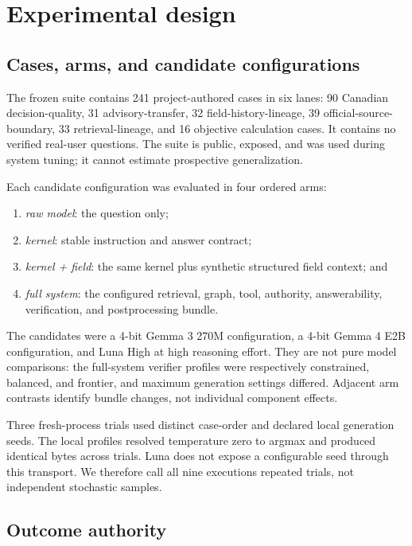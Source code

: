 \documentclass[9pt,twocolumn]{article}
\begin{document}
\section{Experimental design}

\subsection{Cases, arms, and candidate configurations}

The frozen suite contains 241 project-authored cases in six lanes: 90 Canadian decision-quality, 31 advisory-transfer, 32 field-history-lineage, 39 official-source-boundary, 33 retrieval-lineage, and 16 objective calculation cases. It contains no verified real-user questions. The suite is public, exposed, and was used during system tuning; it cannot estimate prospective generalization.

Each candidate configuration was evaluated in four ordered arms:

\begin{enumerate}
  \item \textit{raw model}: the question only;
  \item \textit{kernel}: stable instruction and answer contract;
  \item \textit{kernel + field}: the same kernel plus synthetic structured field context; and
  \item \textit{full system}: the configured retrieval, graph, tool, authority, answerability, verification, and postprocessing bundle.
\end{enumerate}

The candidates were a 4-bit Gemma 3 270M configuration, a 4-bit Gemma 4 E2B configuration, and Luna High at high reasoning effort. They are not pure model comparisons: the full-system verifier profiles were respectively constrained, balanced, and frontier, and maximum generation settings differed. Adjacent arm contrasts identify bundle changes, not individual component effects.

Three fresh-process trials used distinct case-order and declared local generation seeds. The local profiles resolved temperature zero to argmax and produced identical bytes across trials. Luna does not expose a configurable seed through this transport. We therefore call all nine executions repeated trials, not independent stochastic samples.

\subsection{Outcome authority}
\end{document}
